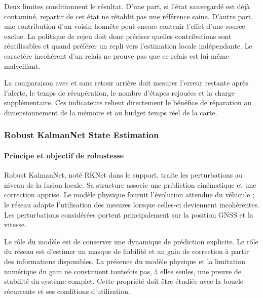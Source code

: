 Deux limites conditionnent le résultat. D'une part, si l'état sauvegardé est déjà contaminé, repartir de cet état ne rétablit pas une référence saine. D'autre part, une contribution d'un voisin honnête peut encore contenir l'effet d'une source exclue. La politique de rejeu doit donc préciser quelles contributions sont réutilisables et quand préférer un repli vers l'estimation locale indépendante. Le caractère incohérent d'un relais ne prouve pas que ce relais est lui-même malveillant.

La comparaison avec et sans retour arrière doit mesurer l'erreur restante après l'alerte, le temps de récupération, le nombre d'étapes rejouées et la charge supplémentaire. Ces indicateurs relient directement le bénéfice de réparation au dimensionnement de la mémoire et au budget temps réel de la carte.
\FloatBarrier

\subsubsection{Robust KalmanNet State Estimation}
\label{sec:rknet}

\paragraph{Principe et objectif de robustesse}
Robust KalmanNet, noté RKNet dans le support, traite les perturbations au niveau de la fusion locale. Sa structure associe une prédiction cinématique et une correction apprise. Le modèle physique fournit l'évolution attendue du véhicule ; le réseau adapte l'utilisation des mesures lorsque celles-ci deviennent incohérentes. Les perturbations considérées portent principalement sur la position GNSS et la vitesse.


Le rôle du modèle est de conserver une dynamique de prédiction explicite. Le rôle du réseau est d'estimer un masque de fiabilité et un gain de correction à partir des informations disponibles. La présence du modèle physique et la limitation numérique du gain ne constituent toutefois pas, à elles seules, une preuve de stabilité du système complet. Cette propriété doit être étudiée avec la boucle récurrente et ses conditions d'utilisation.


